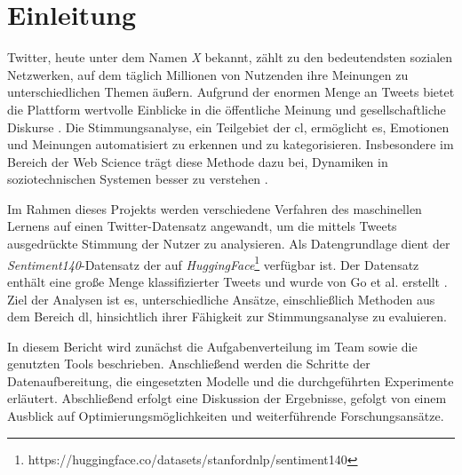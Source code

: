 \section{Einleitung}\label{sec:einleitung}

Twitter, heute unter dem Namen \textit{X} bekannt, zählt zu den bedeutendsten sozialen Netzwerken, auf dem täglich Millionen von Nutzenden ihre Meinungen zu unterschiedlichen Themen äußern.
Aufgrund der enormen Menge an Tweets bietet die Plattform wertvolle Einblicke in die öffentliche Meinung und gesellschaftliche Diskurse \cite{pak2010twitter}.
Die Stimmungsanalyse, ein Teilgebiet der \gls{cl}, ermöglicht es, Emotionen und Meinungen automatisiert zu erkennen und zu kategorisieren.
Insbesondere im Bereich der Web Science trägt diese Methode dazu bei, Dynamiken in soziotechnischen Systemen besser zu verstehen \cite{berners2006web, liu2012sentiment}.

Im Rahmen dieses Projekts werden verschiedene Verfahren des maschinellen Lernens auf einen Twitter-Datensatz angewandt, um die mittels Tweets ausgedrückte Stimmung der Nutzer zu analysieren.
Als Datengrundlage dient der \textit{Sentiment140}-Datensatz der auf \textit{HuggingFace}\footnote{https://huggingface.co/datasets/stanfordnlp/sentiment140} verfügbar ist.
Der Datensatz enthält eine große Menge klassifizierter Tweets und wurde von Go et al. erstellt \cite{go2009twitter}.
Ziel der Analysen ist es, unterschiedliche Ansätze, einschließlich Methoden aus dem Bereich \gls{dl}, hinsichtlich ihrer Fähigkeit zur Stimmungsanalyse zu evaluieren.

In diesem Bericht wird zunächst die Aufgabenverteilung im Team sowie die genutzten Tools beschrieben.
Anschließend werden die Schritte der Datenaufbereitung, die eingesetzten Modelle und die durchgeführten Experimente erläutert.
Abschließend erfolgt eine Diskussion der Ergebnisse, gefolgt von einem Ausblick auf Optimierungsmöglichkeiten und weiterführende Forschungsansätze.
